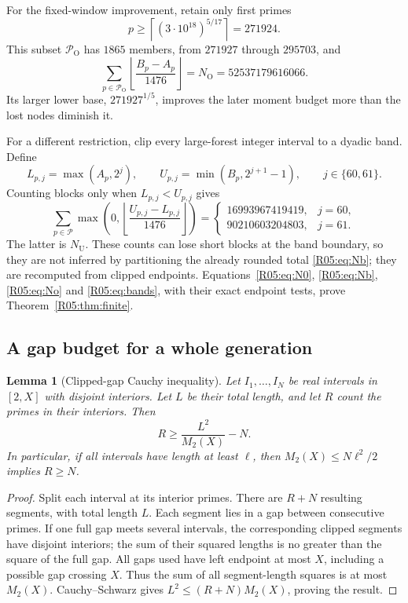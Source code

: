 \documentclass[11pt,a4paper]{article}
\newtheorem{lemma}[theorem]{Lemma}\newtheorem{proposition}[theorem]{Proposition}
\theoremstyle{definition}\newtheorem{definition}[theorem]{Definition}
\theoremstyle{remark}\newtheorem{remark}[theorem]{Remark}
\newcommand{\floor}[1]{\left\lfloor#1\right\rfloor}
\newcommand{\ceil}[1]{\left\lceil#1\right\rceil}
\newcommand{\No}{N_{\mathrm O}}\newcommand{\Nu}{N_{\mathrm U}}
\begin{document}
For the fixed-window improvement, retain only first primes
\[
 p\ge\ceil{(3\cdot10^{18})^{5/17}}=271924.
\]
This subset $\mathcal P_{\mathrm O}$ has $1865$ members, from
$271927$ through $295703$, and
\begin{equation}\label{R05:eq:No}
 \sum_{p\in\mathcal P_{\mathrm O}}
 \floor{\frac{B_p-A_p}{1476}}=\No=52537179616066.
\end{equation}
Its larger lower base, $271927^{1/5}$, improves the later moment budget
more than the lost nodes diminish it.

For a different restriction, clip every large-forest integer interval
to a dyadic band. Define
\[
 L_{p,j}=\max(A_p,2^j),\qquad
 U_{p,j}=\min(B_p,2^{j+1}-1),\qquad j\in\{60,61\}.
\]
Counting blocks only when $L_{p,j}<U_{p,j}$ gives
\begin{equation}\label{R05:eq:bands}
 \sum_{p\in\mathcal P}\max\left(0,
    \floor{\frac{U_{p,j}-L_{p,j}}{1476}}\right)
 =\begin{cases}
 16993967419419,&j=60,\\
 90210603204803,&j=61.
 \end{cases}
\end{equation}
The latter is $\Nu$. These counts can lose short blocks at the band
boundary, so they are not inferred by partitioning the already
rounded total \eqref{R05:eq:Nb}; they are recomputed from clipped endpoints.
Equations~\eqref{R05:eq:N0}, \eqref{R05:eq:Nb}, \eqref{R05:eq:No} and
\eqref{R05:eq:bands}, with their exact endpoint tests, prove
Theorem~\ref{R05:thm:finite}.

\subsection{A gap budget for a whole generation}
\label{R05:sec:cauchy}

\begin{lemma}[Clipped-gap Cauchy inequality]\label{R05:lem:cauchy}
Let $I_1,\ldots,I_N$ be real intervals in $[2,X]$ with disjoint
interiors. Let $L$ be their total length, and let $R$ count the primes
in their interiors. Then
\begin{equation}\label{R05:eq:cauchy}
 R\ge\frac{L^2}{M_2(X)}-N.
\end{equation}
In particular, if all intervals have length at least $\ell$, then
$M_2(X)\le N\ell^2/2$ implies $R\ge N$.
\end{lemma}
\begin{proof}
Split each interval at its interior primes. There are $R+N$ resulting
segments, with total length $L$. Each segment lies in a gap between
consecutive primes. If one full gap meets several intervals, the
corresponding clipped segments have disjoint interiors; the sum of
their squared lengths is no greater than the square of the full gap.
All gaps used have left endpoint at most $X$, including a possible
gap crossing $X$. Thus the sum of all segment-length squares is at
most $M_2(X)$. Cauchy--Schwarz gives
$L^2\le(R+N)M_2(X)$, proving the result.
\end{proof}
\end{document}
